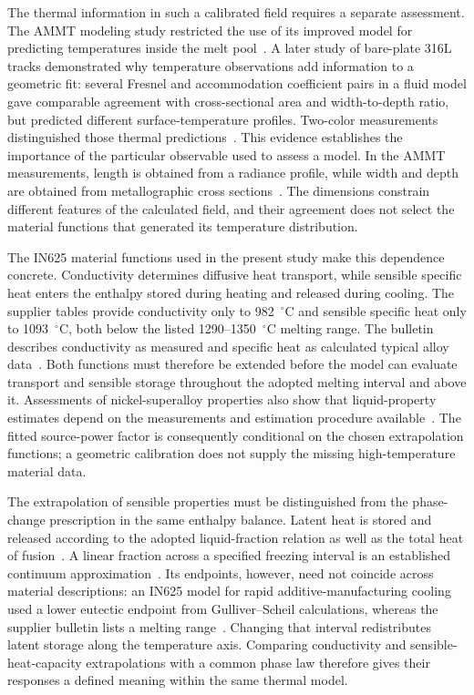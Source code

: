 The thermal information in such a calibrated field requires a separate assessment. The AMMT modeling study restricted the use of its improved model for predicting temperatures inside the melt pool~\cite{kollmannsberger2019}. A later study of bare-plate 316L tracks demonstrated why temperature observations add information to a geometric fit: several Fresnel and accommodation coefficient pairs in a fluid model gave comparable agreement with cross-sectional area and width-to-depth ratio, but predicted different surface-temperature profiles. Two-color measurements distinguished those thermal predictions~\cite{myers2023}. This evidence establishes the importance of the particular observable used to assess a model. In the AMMT measurements, length is obtained from a radiance profile, while width and depth are obtained from metallographic cross sections~\cite{lane2020}. The dimensions constrain different features of the calculated field, and their agreement does not select the material functions that generated its temperature distribution.

The IN625 material functions used in the present study make this dependence concrete. Conductivity determines diffusive heat transport, while sensible specific heat enters the enthalpy stored during heating and released during cooling. The supplier tables provide conductivity only to 982~$^\circ$C and sensible specific heat only to 1093~$^\circ$C, both below the listed 1290--1350~$^\circ$C melting range. The bulletin describes conductivity as measured and specific heat as calculated typical alloy data~\cite{specialmetals625}. Both functions must therefore be extended before the model can evaluate transport and sensible storage throughout the adopted melting interval and above it. Assessments of nickel-superalloy properties also show that liquid-property estimates depend on the measurements and estimation procedure available~\cite{mills2006}. The fitted source-power factor is consequently conditional on the chosen extrapolation functions; a geometric calibration does not supply the missing high-temperature material data.

The extrapolation of sensible properties must be distinguished from the phase-change prescription in the same enthalpy balance. Latent heat is stored and released according to the adopted liquid-fraction relation as well as the total heat of fusion~\cite{vanelsen2007}. A linear fraction across a specified freezing interval is an established continuum approximation~\cite{dynamic2024}. Its endpoints, however, need not coincide across material descriptions: an IN625 model for rapid additive-manufacturing cooling used a lower eutectic endpoint from Gulliver--Scheil calculations, whereas the supplier bulletin lists a melting range~\cite{dynamic2024,specialmetals625}. Changing that interval redistributes latent storage along the temperature axis. Comparing conductivity and sensible-heat-capacity extrapolations with a common phase law therefore gives their responses a defined meaning within the same thermal model.

